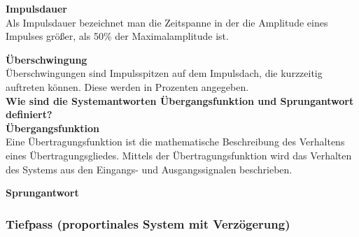 \textbf{Impulsdauer}\\
Als Impulsdauer bezeichnet man die Zeitspanne in der die Amplitude eines Impulses größer, als 50\% der 
Maximalamplitude ist.

\textbf{Überschwingung}\\
Überschwingungen sind Impulsspitzen auf dem Impulsdach, die kurzzeitig auftreten können. 
Diese werden in Prozenten angegeben.\\

\textbf{Wie sind die Systemantworten Übergangsfunktion und Sprungantwort definiert?}\\

\textbf{Übergangsfunktion}\\
Eine Übertragungsfunktion ist die mathematische Beschreibung des Verhaltens eines Übertragungsgliedes. 
Mittels der Übertragungsfunktion wird das Verhalten des Systems aus den Eingangs- und Ausgangssignalen beschrieben.

\textbf{Sprungantwort}\\

\subsubsection{Tiefpass (proportinales System mit Verzögerung)}

